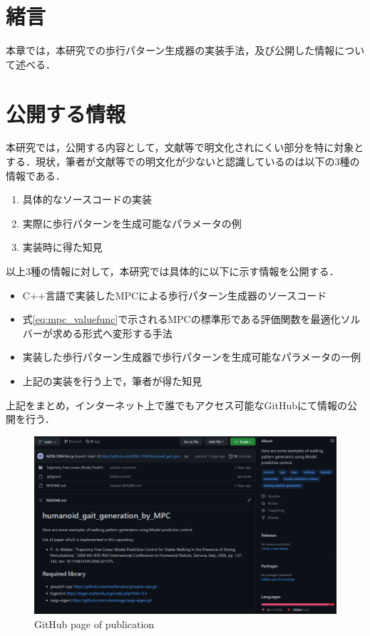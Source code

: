 \section{緒言}
本章では，本研究での歩行パターン生成器の実装手法，及び公開した情報について述べる．

\section{公開する情報}
本研究では，公開する内容として，文献等で明文化されにくい部分を特に対象とする．現状，筆者が文献等での明文化が少ないと認識しているのは以下の3種の情報である．
\begin{enumerate}
  \item 具体的なソースコードの実装
  \item 実際に歩行パターンを生成可能なパラメータの例
  \item 実装時に得た知見
\end{enumerate}

以上3種の情報に対して，本研究では具体的に以下に示す情報を公開する．

\begin{itemize}
  \item C++言語で実装したMPCによる歩行パターン生成器のソースコード
  \item 式\eqref{eq:mpc_valuefunc}で示されるMPCの標準形である評価関数を最適化ソルバーが求める形式へ変形する手法
  \item 実装した歩行パターン生成器で歩行パターンを生成可能なパラメータの一例
  \item 上記の実装を行う上で，筆者が得た知見
\end{itemize}

上記をまとめ，インターネット上で誰でもアクセス可能なGitHub\cite{MYGITHUB}にて情報の公開を行う．

\begin{figure}[hbtp]
  \centering
  \includegraphics[keepaspectratio, scale=0.4]
  {images/github_example.png}
  \caption{ GitHub page of publication}
  \label{Fig:github_example}
\end{figure}

